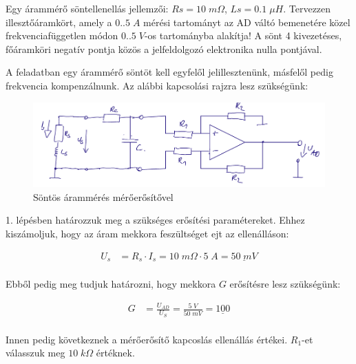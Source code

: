 \begin{example2}

Egy árammérő söntellenellás jellemzői: $Rs=10\;m\Omega{}$, $Ls=0.1\;\mu{}H$. Tervezzen illesztőáramkört, amely a $0..5\;A$ mérési tartományt az AD váltó bemenetére közel frekvenciafüggetlen módon $0..5\;V$-os tartományba alakítja! A sönt 4 kivezetéses, főáramköri negatív pontja közös a jelfeldolgozó elektronika nulla pontjával.

\end{example2}

A feladatban egy árammérő söntöt kell egyfelől jelillesztenünk, másfelől pedig frekvencia kompenzálnunk. Az alábbi kapcsolási rajzra lesz szükségünk:

\begin{figure}[h!]
    \centering
    \includegraphics[width=1\linewidth]{Figures//tmp/42_schematic.png}
    \caption{Söntös árammérés mérőerősítővel}
    \label{fig:enter-label}
\end{figure}

1. lépésben határozzuk meg a szükséges erősítési paramétereket. Ehhez kiszámoljuk, hogy az áram mekkora feszültséget ejt az ellenálláson:

\begin{equation}
\begin{aligned}{}
    U_{s} &= R_s \cdot I_s = 10\; m\Omega{} \cdot 5\;A = \underline{50\; mV} \\
\end{aligned}
\end{equation}

Ebből pedig meg tudjuk határozni, hogy mekkora $G$ erősítésre lesz szükségünk:

\begin{equation}
\begin{aligned}{}
    G &= \frac{U_{AD}}{U_S} = \frac{5\;V}{50\;mV} = \underline{100} \\
\end{aligned}
\end{equation}

Innen pedig következnek a mérőerősítő kapcoslás ellenállás értékei. $R_1$-et válasszuk meg $10\;k\Omega$ értéknek.

